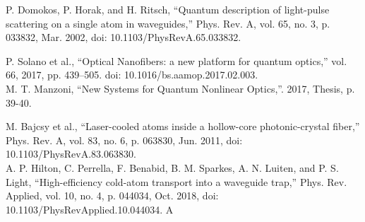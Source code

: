 \begin{thebibliography}{hcpcf}
	 P. Domokos, P. Horak, and H. Ritsch, “Quantum description of light-pulse scattering on a single atom in waveguides,” Phys. Rev. A, vol. 65, no. 3, p. 033832, Mar. 2002, doi: 10.1103/PhysRevA.65.033832.
	
	 P. Solano et al., “Optical Nanofibers: a new platform for quantum optics,” vol. 66, 2017, pp. 439–505. doi: 10.1016/bs.aamop.2017.02.003.\\
	
	 M. T. Manzoni, “New Systems for Quantum Nonlinear Optics,”. 2017, Thesis, p. 39-40.
	
	 M. Bajcsy et al., “Laser-cooled atoms inside a hollow-core photonic-crystal fiber,” Phys. Rev. A, vol. 83, no. 6, p. 063830, Jun. 2011, doi: 10.1103/PhysRevA.83.063830. \\
	 A. P. Hilton, C. Perrella, F. Benabid, B. M. Sparkes, A. N. Luiten, and P. S. Light, “High-efficiency cold-atom transport into a waveguide trap,” Phys. Rev. Applied, vol. 10, no. 4, p. 044034, Oct. 2018, doi: 10.1103/PhysRevApplied.10.044034. A
\end{thebibliography}